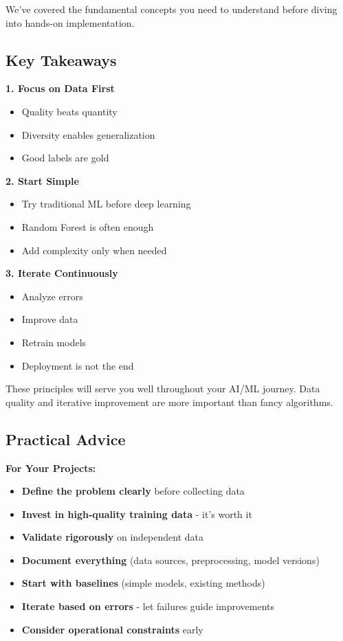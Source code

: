 \documentclass[
  letterpaper,
  DIV=11,
  numbers=noendperiod]{scrartcl}
\providecommand{\tightlist}{%
  \setlength{\itemsep}{0pt}\setlength{\parskip}{0pt}}
\begin{document}
We've covered the fundamental concepts you need to understand before
diving into hands-on implementation.

\subsection{Key Takeaways}\label{key-takeaways}

\textbf{1. Focus on Data First}

\begin{itemize}
\tightlist
\item
  Quality beats quantity
\item
  Diversity enables generalization
\item
  Good labels are gold
\end{itemize}

\textbf{2. Start Simple}

\begin{itemize}
\tightlist
\item
  Try traditional ML before deep learning
\item
  Random Forest is often enough
\item
  Add complexity only when needed
\end{itemize}

\textbf{3. Iterate Continuously}

\begin{itemize}
\tightlist
\item
  Analyze errors
\item
  Improve data
\item
  Retrain models
\item
  Deployment is not the end
\end{itemize}

These principles will serve you well throughout your AI/ML journey. Data
quality and iterative improvement are more important than fancy
algorithms.

\subsection{Practical Advice}\label{practical-advice}

\textbf{For Your Projects:}

\begin{itemize}
\tightlist
\item
  \textbf{Define the problem clearly} before collecting data
\item
  \textbf{Invest in high-quality training data} - it's worth it
\item
  \textbf{Validate rigorously} on independent data
\item
  \textbf{Document everything} (data sources, preprocessing, model
  versions)
\item
  \textbf{Start with baselines} (simple models, existing methods)
\item
  \textbf{Iterate based on errors} - let failures guide improvements
\item
  \textbf{Consider operational constraints} early
\end{itemize}
\end{document}
